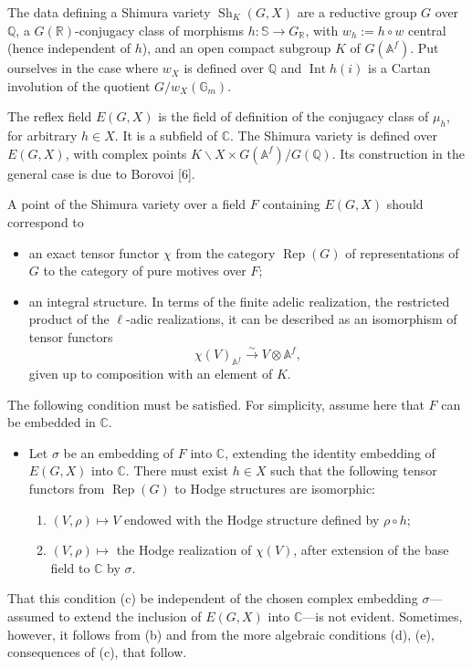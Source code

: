 \documentclass[11pt,a4paper]{article}
\theoremstyle{plain}
\theoremstyle{definition}
\DeclareMathOperator{\Rep}{Rep}
\DeclareMathOperator{\Int}{Int}
\DeclareMathOperator{\Sh}{Sh}
\newcommand{\Q}{\mathbb{Q}}
\newcommand{\C}{\mathbb{C}}
\newcommand{\R}{\mathbb{R}}
\newcommand{\Af}{\mathbb{A}^f}
\begin{document}
The data defining a Shimura variety $\Sh_K(G,X)$ are a reductive group $G$ over $\Q$, a $G(\R)$-conjugacy class of morphisms $h:\mathbb{S}\to G_{\R}$, with $w_h:=h\circ w$ central (hence independent of $h$), and an open compact subgroup $K$ of $G(\Af)$. Put ourselves in the case where $w_X$ is defined over $\Q$ and $\Int h(i)$ is a Cartan involution of the quotient $G/w_X(\mathbb{G}_m)$.

The reflex field $E(G,X)$ is the field of definition of the conjugacy class of $\mu_h$, for arbitrary $h\in X$. It is a subfield of $\C$. The Shimura variety is defined over $E(G,X)$, with complex points $K\backslash X\times G(\Af)/G(\Q)$. Its construction in the general case is due to Borovoi [6].

A point of the Shimura variety over a field $F$ containing $E(G,X)$ should correspond to
\begin{itemize}
\item[(a)] an exact tensor functor $\chi$ from the category $\Rep(G)$ of representations of $G$ to the category of pure motives over $F$;
\item[(b)] an integral structure. In terms of the finite adelic realization, the restricted product of the $\ell$-adic realizations, it can be described as an isomorphism of tensor functors
$$
\chi(V)_{\Af}\xrightarrow{\sim}V\otimes\Af,
$$
given up to composition with an element of $K$.
\end{itemize}

The following condition must be satisfied. For simplicity, assume here that $F$ can be embedded in $\C$.
\begin{itemize}
\item[(c)] Let $\sigma$ be an embedding of $F$ into $\C$, extending the identity embedding of $E(G,X)$ into $\C$. There must exist $h\in X$ such that the following tensor functors from $\Rep(G)$ to Hodge structures are isomorphic:
\begin{enumerate}
\item[(1)] $(V,\rho)\mapsto V$ endowed with the Hodge structure defined by $\rho\circ h$;
\item[(2)] $(V,\rho)\mapsto$ the Hodge realization of $\chi(V)$, after extension of the base field to $\C$ by $\sigma$.
\end{enumerate}
\end{itemize}

That this condition (c) be independent of the chosen complex embedding $\sigma$---assumed to extend the inclusion of $E(G,X)$ into $\C$---is not evident. Sometimes, however, it follows from (b) and from the more algebraic conditions (d), (e), consequences of (c), that follow.
\end{document}
